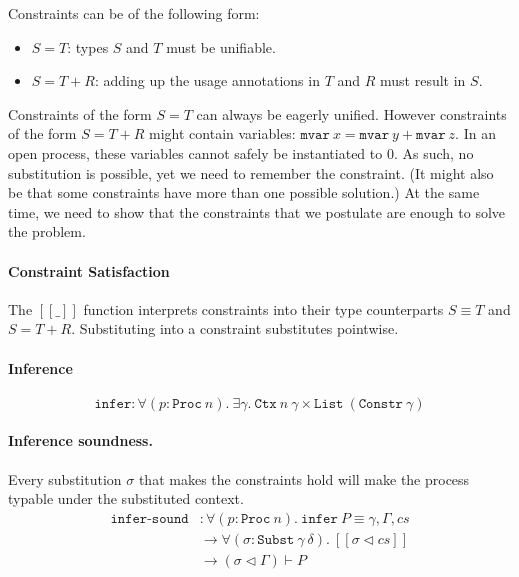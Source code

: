 \documentclass[sigplan,screen,review]{acmart}
\begin{document}
Constraints can be of the following form:

\begin{itemize}
\item
  \(S = T\): types \(S\) and \(T\) must be unifiable.
\item
  \(S = T + R\): adding up the usage annotations in \(T\) and \(R\) must
  result in \(S\).
\end{itemize}

Constraints of the form \(S = T\) can always be eagerly unified. However
constraints of the form \(S = T + R\) might contain variables:
\(\texttt{mvar}~x = \texttt{mvar}~y + \texttt{mvar}~z\). In an open
process, these variables cannot safely be instantiated to \(0\). As
such, no substitution is possible, yet we need to remember the
constraint. (It might also be that some constraints have more than one
possible solution.) At the same time, we need to show that the
constraints that we postulate are enough to solve the problem.

\paragraph{Constraint Satisfaction}

The \([\![\_]\!]\) function interprets constraints into their type
counterparts \(S \equiv T\) and \(S = T + R\). Substituting into a
constraint substitutes pointwise.

\paragraph{Inference}

\[
\texttt{infer} : \forall (p : \texttt{Proc}~n). ~ \exists \gamma. ~ \texttt{Ctx}~n~\gamma \times \texttt{List}~(\texttt{Constr}~\gamma)
\]

\paragraph{Inference soundness.}

Every substitution \(\sigma\) that makes the constraints hold will make
the process typable under the substituted context. \[
\begin{aligned}
\texttt{infer-sound} &: \forall (p : \texttt{Proc}~n). ~ \texttt{infer}~P \equiv \gamma , \Gamma , cs \\
&\to \forall (\sigma : \texttt{Subst}~\gamma~\delta). ~ [\![ \sigma \triangleleft cs ]\!] \\
&\to (\sigma \triangleleft \Gamma) \vdash P
\end{aligned}
\]
\end{document}
